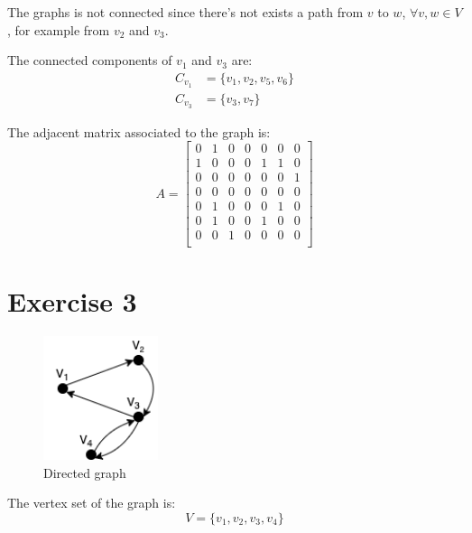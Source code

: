 \documentclass{article}
\begin{document}
    \par\noindent The graphs is not connected since there's not exists a path from \(v\) to \(w\), \(\forall v,w \in V\), for example from \(v_{2}\) and \(v_{3}\).\newline
    
    \par\noindent The connected components of \(v_{1}\) and \(v_{3}\) are:
    \begin{align*}
    C_{v_{1}} &= \{v_{1},v_{2},v_{5},v_{6}\} \\
    C_{v_{3}} &= \{v_{3},v_{7}\}
    \end{align*}
    
    \par\noindent The adjacent matrix associated to the graph is:
    \begin{equation*}
    A =
        \begin{bmatrix}
        0 & 1 & 0 & 0 & 0 & 0 & 0\\
        1 & 0 & 0 & 0 & 1 & 1 & 0\\
        0 & 0 & 0 & 0 & 0 & 0 & 1\\
        0 & 0 & 0 & 0 & 0 & 0 & 0\\
        0 & 1 & 0 & 0 & 0 & 1 & 0\\
        0 & 1 & 0 & 0 & 1 & 0 & 0\\
        0 & 0 & 1 & 0 & 0 & 0 & 0\\
        \end{bmatrix}
    \end{equation*}
    
\section{Exercise 3}
    \begin{figure}[H]
        \centering
        \includegraphics[width=0.3\textwidth]{5.png}
        \caption{Directed graph}
        \label{fig:figure-3}
    \end{figure}
    
    The vertex set of the graph is: \[V=\{v_{1},v_{2},v_{3},v_{4}\}\]
    
\end{document}
